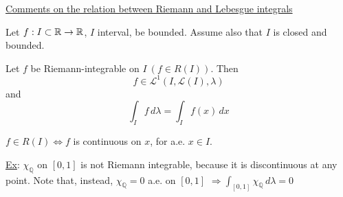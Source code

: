 \noindent\underline{Comments on the relation between Riemann and Lebesgue integrals}

Let \(f : I \subset \mathbb{R} \to \mathbb{R}\), \(I\) interval, be bounded. Assume also that \(I\) is closed and bounded.
\begin{theorem}
    Let \(f\) be Riemann-integrable on \(I \ (f \in R(I))\). Then 
    \[
        f\in \mathcal{L}^1(I, \mathcal{L}(I), \lambda)
    \]
    and 
    \[
        \int_I f \, d\lambda = \int_I f(x) \, dx
    \]
\end{theorem}
\begin{theorem}
    \(f \in R(I) \Leftrightarrow f\) is continuous on \(x\), for a.e. \(x \in I\).
\end{theorem}
\noindent\underline{Ex}: \(\chi_{\mathbb{Q}}\) on \([0,1]\) is not Riemann integrable, because it is discontinuous at any point. Note that, instead, \(\chi_{\mathbb{Q}} = 0\) a.e. on \([0,1]\) \(\Rightarrow \int_{[0,1]} \chi_{\mathbb{Q}} \, d\lambda = 0\)